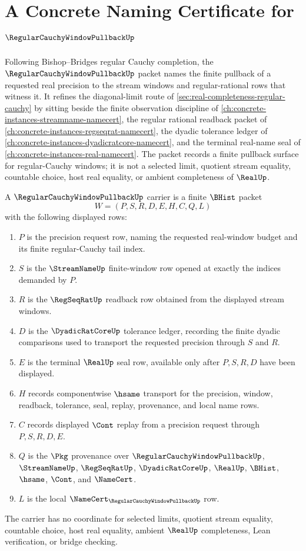 \chapter{A Concrete Naming Certificate for $\RegularCauchyWindowPullbackUp$}
\label{ch:concrete-instances-regular-cauchy-window-pullback-namecert}

Following Bishop--Bridges regular Cauchy completion, the $\RegularCauchyWindowPullbackUp$ packet names the finite pullback of a requested real precision to the stream windows and regular-rational rows that witness it. It refines the diagonal-limit route of \autoref{sec:real-completeness-regular-cauchy} by sitting beside the finite observation discipline of \autoref{ch:concrete-instances-streamname-namecert}, the regular rational readback packet of \autoref{ch:concrete-instances-regseqrat-namecert}, the dyadic tolerance ledger of \autoref{ch:concrete-instances-dyadicratcore-namecert}, and the terminal real-name seal of \autoref{ch:concrete-instances-real-namecert}. The packet records a finite pullback surface for regular-Cauchy windows; it is not a selected limit, quotient stream equality, countable choice, host real equality, or ambient completeness of $\RealUp$.

\begin{definition}
\label{def:regular-cauchy-window-pullback-carrier}
A $\RegularCauchyWindowPullbackUp$ carrier is a finite $\BHist$ packet
$$
W=(P,S,R,D,E,H,C,Q,L)
$$
with the following displayed rows:
\begin{enumerate}
\item $P$ is the precision request row, naming the requested real-window budget and its finite regular-Cauchy tail index.
\item $S$ is the $\StreamNameUp$ finite-window row opened at exactly the indices demanded by $P$.
\item $R$ is the $\RegSeqRatUp$ readback row obtained from the displayed stream windows.
\item $D$ is the $\DyadicRatCoreUp$ tolerance ledger, recording the finite dyadic comparisons used to transport the requested precision through $S$ and $R$.
\item $E$ is the terminal $\RealUp$ seal row, available only after $P,S,R,D$ have been displayed.
\item $H$ records componentwise $\hsame$ transport for the precision, window, readback, tolerance, seal, replay, provenance, and local name rows.
\item $C$ records displayed $\Cont$ replay from a precision request through $P,S,R,D,E$.
\item $Q$ is the $\Pkg$ provenance over $\RegularCauchyWindowPullbackUp$, $\StreamNameUp$, $\RegSeqRatUp$, $\DyadicRatCoreUp$, $\RealUp$, $\BHist$, $\hsame$, $\Cont$, and $\NameCert$.
\item $L$ is the local $\NameCert_{\RegularCauchyWindowPullbackUp}$ row.
\end{enumerate}
The carrier has no coordinate for selected limits, quotient stream equality, countable choice, host real equality, ambient $\RealUp$ completeness, Lean verification, or bridge checking.
\end{definition}


